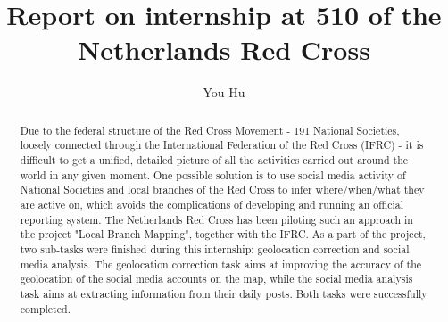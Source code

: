 \documentclass[sigchi]{acmart}
\begin{document}
\title{Report on internship at 510 of the Netherlands Red Cross}

\author{You Hu}



\renewcommand{\shortauthors}{You Hu}

\begin{abstract}

Due to the federal structure of the Red Cross Movement - 191 National Societies, loosely connected through the International Federation of the Red Cross (IFRC) - it is difficult to get a unified, detailed picture of all the activities carried out around the world in any given moment. One possible solution is to use social media activity of National Societies and local branches of the Red Cross to infer where/when/what they are active on, which avoids the complications of developing and running an official reporting system. The Netherlands Red Cross has been piloting such an approach in the project "Local Branch Mapping", together with the IFRC. As a part of the project, two sub-tasks were finished during this internship: geolocation correction and social media analysis. The geolocation correction task aims at improving the accuracy of the geolocation of the social media accounts on the map, while the social media analysis task aims at extracting information from their daily posts. Both tasks were successfully completed. 
\end{abstract}


\end{document}
